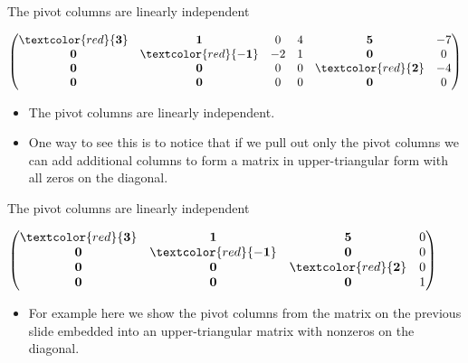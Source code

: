 \documentclass{beamer}
\begin{document}
\begin{frame}{The pivot columns are linearly independent}

$
\begin{pmatrix}
\textcolor{red}{\mathbf{3}} & \mathbf{1}                   &  0  & 4 & \mathbf{5}                  & -7 \\
\mathbf{0}                  & \textcolor{red}{\mathbf{-1}} & -2  & 1 & \mathbf{0}                  & 0  \\
\mathbf{0}                  & \mathbf{0}                   &  0  & 0 & \textcolor{red}{\mathbf{2}} & -4 \\
\mathbf{0}                  & \mathbf{0}                   &  0  & 0 & \mathbf{0}                  & 0  \\
\end{pmatrix}
$
\begin{itemize}
\item The pivot columns are linearly independent.
\item One way to see this is to notice that if we pull out only the pivot columns
we can add additional columns to form a matrix in upper-triangular form with all zeros on the diagonal.
\end{itemize}

\end{frame}


\begin{frame}{The pivot columns are linearly independent}

$
\begin{pmatrix}
\textcolor{red}{\mathbf{3}} & \mathbf{1}                   & \mathbf{5}                  & 0 \\
\mathbf{0}                  & \textcolor{red}{\mathbf{-1}} & \mathbf{0}                  & 0 \\
\mathbf{0}                  & \mathbf{0}                   & \textcolor{red}{\mathbf{2}} & 0 \\
\mathbf{0}                  & \mathbf{0}                   & \mathbf{0}                  & 1
\end{pmatrix}
$
\begin{itemize}
\item For example here we show the pivot columns from the matrix on the previous slide
embedded into an upper-triangular matrix with nonzeros on the diagonal.
\end{itemize}

\end{frame}
\end{document}
